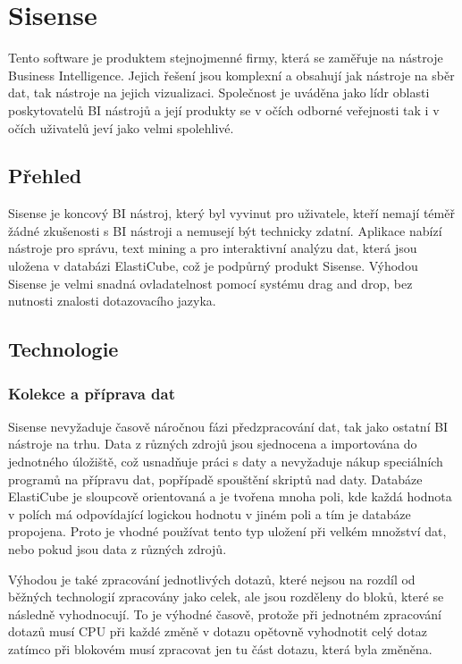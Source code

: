 \documentclass[czech,BP]{thesiskiv}
\begin{document}
 
 \section{Sisense}
  Tento software je produktem stejnojmenné firmy, která se zaměřuje na nástroje Business Intelligence. Jejich řešení jsou komplexní a obsahují jak nástroje na sběr dat, tak nástroje na jejich vizualizaci. Společnost je uváděna jako lídr oblasti poskytovatelů BI nástrojů a její produkty se v očích odborné veřejnosti tak i v očích uživatelů jeví jako velmi spolehlivé.\cite{SisenseStandings}
 
 \subsection{Přehled}

 Sisense je koncový BI nástroj, který byl vyvinut pro uživatele, kteří nemají téměř žádné zkušenosti s BI nástroji a nemusejí být technicky zdatní. Aplikace nabízí nástroje pro správu, text mining a pro interaktivní analýzu dat, která jsou uložena v databázi ElastiCube, což je podpůrný produkt Sisense. Výhodou Sisense je velmi snadná ovladatelnost pomocí systému drag and drop, bez nutnosti znalosti dotazovacího jazyka.
 
 \subsection{Technologie}
 \subsubsection{Kolekce a příprava dat}
  Sisense nevyžaduje časově náročnou fázi předzpracování dat, tak jako ostatní BI nástroje na trhu. Data z různých zdrojů jsou sjednocena a importována do jednotného úložiště, což usnadňuje práci s daty a nevyžaduje nákup speciálních programů na přípravu dat, popřípadě spouštění skriptů nad daty. Databáze ElastiCube je sloupcově orientovaná a je tvořena mnoha poli, kde každá hodnota v polích má odpovídající logickou hodnotu v jiném poli a tím je databáze propojena. Proto je vhodné používat tento typ uložení při velkém množství dat, nebo pokud jsou data z různých zdrojů.
  
  
  Výhodou je také zpracování jednotlivých dotazů, které nejsou na rozdíl od běžných technologií zpracovány jako celek, ale jsou rozděleny do bloků, které se následně vyhodnocují. To je výhodné časově, protože při jednotném zpracování dotazů musí CPU při každé změně v dotazu opětovně vyhodnotit celý dotaz zatímco při blokovém musí zpracovat jen tu část dotazu, která byla změněna.\cite{ElasticCube}
  
\end{document}
